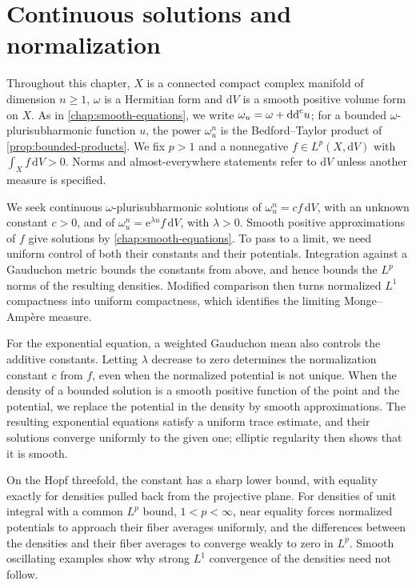 \chapter{Continuous solutions and normalization}
\label{chap:weak-equations}

Throughout this chapter, $X$ is a connected compact complex manifold of dimension $n\geq1$, $\omega$ is a Hermitian form and $\mathrm{d}V$ is a smooth positive volume form on $X$. As in \cref{chap:smooth-equations}, we write $\omega_u=\omega+\mathrm{dd}^{\mathrm{c}} u$; for a bounded $\omega$-plurisubharmonic function $u$, the power $\omega_u^n$ is the Bedford--Taylor product of \cref{prop:bounded-products}. We fix $p>1$ and a nonnegative $f\in L^p(X,\mathrm{d}V)$ with $\int_Xf\,\mathrm{d}V>0$. Norms and almost-everywhere statements refer to $\mathrm{d}V$ unless another measure is specified.

We seek continuous $\omega$-plurisubharmonic solutions of $\omega_u^n=cf\,\mathrm{d}V$, with an unknown constant $c>0$, and of $\omega_u^n=\mathrm{e}^{\lambda u}f\,\mathrm{d}V$, with $\lambda>0$. Smooth positive approximations of $f$ give solutions by \cref{chap:smooth-equations}. To pass to a limit, we need uniform control of both their constants and their potentials. Integration against a Gauduchon metric bounds the constants from above, and hence bounds the $L^p$ norms of the resulting densities. Modified comparison then turns normalized $L^1$ compactness into uniform compactness, which identifies the limiting Monge--Amp\`ere measure.

For the exponential equation, a weighted Gauduchon mean also controls the additive constants. Letting $\lambda$ decrease to zero determines the normalization constant $c$ from $f$, even when the normalized potential is not unique. When the density of a bounded solution is a smooth positive function of the point and the potential, we replace the potential in the density by smooth approximations. The resulting exponential equations satisfy a uniform trace estimate, and their solutions converge uniformly to the given one; elliptic regularity then shows that it is smooth.

On the Hopf threefold, the constant has a sharp lower bound, with equality exactly for densities pulled back from the projective plane. For densities of unit integral with a common $L^p$ bound, $1<p<\infty$, near equality forces normalized potentials to approach their fiber averages uniformly, and the differences between the densities and their fiber averages to converge weakly to zero in $L^p$. Smooth oscillating examples show why strong $L^1$ convergence of the densities need not follow.

